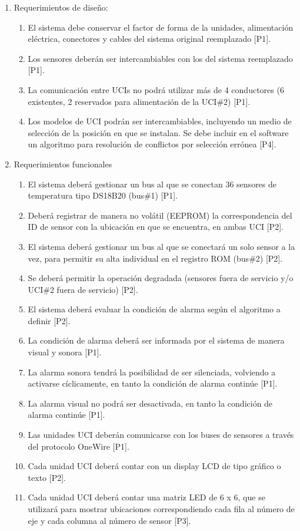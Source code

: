 \documentclass[
11pt, %
codirector, %
]{charter}
\begin{document}
\begin{enumerate}
	\item Requerimientos de diseño:
		\begin{enumerate}
			\item El sistema debe conservar el factor de forma de la unidades, alimentación eléctrica, conectores y cables del sistema original reemplazado [P1].
			\item Los sensores deberán ser intercambiables con los del sistema reemplazado [P1].
			\item La comunicación entre UCIs no podrá utilizar más de 4 conductores (6 existentes, 2 reservados para alimentación de la UCI\#2) [P1].
			\item Los modelos de UCI podrán ser intercambiables, incluyendo un medio de selección de la posición en que se instalan. Se debe incluir en el software un algoritmo para resolución de conflictos por selección errónea [P4]. 
		\end{enumerate}
		
	\item Requerimientos funcionales
		\begin{enumerate}
		\item El sistema deberá gestionar un bus al que se conectan 36 sensores de temperatura tipo DS18B20 (bus\#1) [P1].
		\item Deberá registrar de manera no volátil (EEPROM) la correspondencia del ID de sensor con la ubicación en que se encuentra, en ambas UCI [P2].
		\item El sistema deberá gestionar un bus al que se conectará un solo sensor a la vez, para permitir su alta individual en el registro ROM (bus\#2) [P2].
		\item Se deberá permitir la operación degradada (sensores fuera de 				servicio y/o UCI\#2 fuera de servicio) [P2].
		\item El sistema deberá evaluar la condición de alarma según el 						algoritmo a definir [P2].
		\item La condición de alarma deberá ser informada por el sistema de 					manera visual y sonora [P1].
		\item La alarma sonora tendrá la posibilidad de ser silenciada, 				volviendo a activarse cíclicamente, en tanto la condición de alarma continúe [P1].
		\item La alarma visual no podrá ser desactivada, en tanto la 					condición de alarma continúe [P1].
		\item Las unidades UCI deberán comunicarse con los buses de sensores a través del protocolo OneWire [P1].
		\item Cada unidad UCI deberá contar con un display LCD de tipo gráfico o texto [P2].
		\item Cada unidad UCI deberá contar una matriz LED de 6 x 6, que se utilizará para mostrar ubicaciones correspondiendo cada fila al número de eje y cada columna al número de sensor [P3].
		

\end{enumerate}
\end{enumerate}
\end{document}
